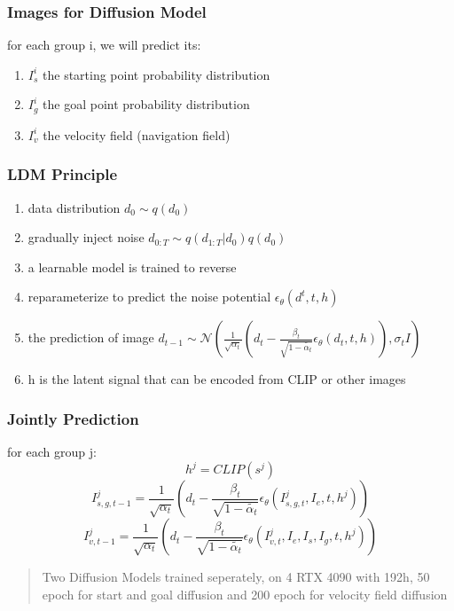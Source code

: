 \begin{frame}
    \frametitle{Images for Diffusion Model}
    for each group i, we will predict its:
    \begin{enumerate}
        \item $I_s^i$ the starting point probability distribution
        \item $I_g^i$ the goal point probability distribution
        \item $I_v^i$ the velocity field (navigation field)
    \end{enumerate}
\end{frame}

\begin{frame}
    \frametitle{LDM Principle}
    \begin{enumerate}
        \item data distribution $d_0\sim q(d_0)$
        \item gradually inject noise $d_{0:T}\sim q(d_{1:T}|d_0)q(d_0)$
        \item a learnable model is trained to reverse 
        \item reparameterize to predict the noise potential $\epsilon_\theta(d^t,t,h)$
        \item the prediction of image $d_{t-1}\sim \mathcal{N}(\frac{1}{\sqrt{\alpha_t}}(d_t-\frac{\beta_t}{\sqrt{1-\tilde{\alpha_t}}}\epsilon_\theta(d_t,t,h)), \sigma_t I)$
        \item h is the latent signal that can be encoded from CLIP or other images
    \end{enumerate}
\end{frame}

\begin{frame}
    \frametitle{Jointly Prediction}
    for each group j:
    $$h^j=CLIP(s^j)$$
    $$I^j_{s,g,t-1}= \frac{1}{\sqrt{\alpha_t}}(d_t-\frac{\beta_t}{\sqrt{1-\tilde{\alpha_t}}}\epsilon_\theta(I^j_{s,g,t},I_e,t,h^j))$$
    $$I^j_{v,t-1}= \frac{1}{\sqrt{\alpha_t}}(d_t-\frac{\beta_t}{\sqrt{1-\tilde{\alpha_t}}}\epsilon_\theta(I^j_{v,t},I_e,I_s,I_g,t,h^j))$$

    \begin{quote}
        Two Diffusion Models trained seperately, on 4 RTX 4090 with 192h, 50 epoch for start and goal diffusion and 200 epoch for velocity field diffusion
    \end{quote}
\end{frame}

